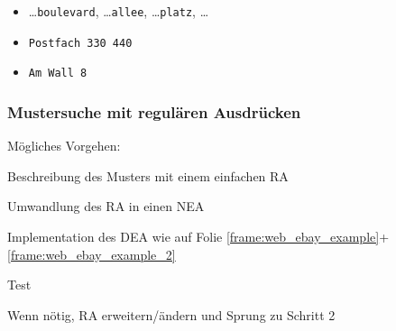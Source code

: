 \begin{frame}
{\begin{itemize}
          \item[]
            \dots\texttt{boulevard}, \dots\texttt{allee}, \dots\texttt{platz}, \dots
            \par\vspace{-1mm}
          \item[]
            \texttt{Postfach 330 440}
            \par\vspace{-1mm}
          \item[]
            \texttt{Am Wall 8}
        \end{itemize}%
      }
      \par\bigskip
    \end{frame}

    \begin{frame}
      \frametitle{Mustersuche mit regulären Ausdrücken}
      
      Mögliches Vorgehen:
      \begin{Enumerate}
        \item[\Bmph{(1)}]
          Beschreibung des Musters mit einem einfachen RA
        \item[\Bmph{(2)}]
          Umwandlung des RA in einen NEA
        \item[\Bmph{(3)}]
          Implementation des DEA wie auf Folie \ref{frame:web_ebay_example}+\ref{frame:web_ebay_example_2}
        \item[\Bmph{(4)}]
          Test
        \item[\Bmph{(5)}]
          Wenn nötig, RA erweitern/ändern und Sprung zu Schritt 2
      \end{Enumerate}

    \end{frame}

